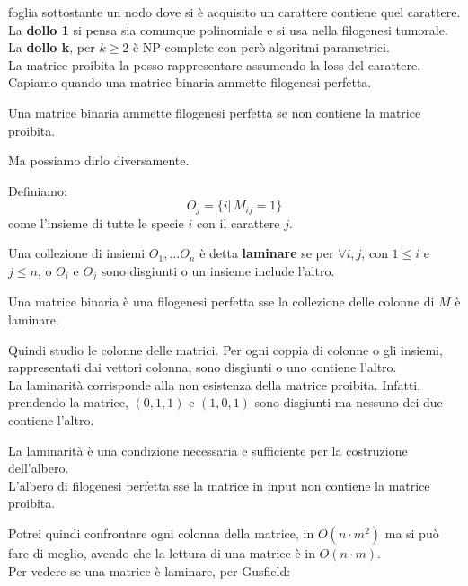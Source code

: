 \documentclass[a4paper,12pt, oneside]{book}
\begin{document}
foglia sottostante un nodo dove si è acquisito un carattere contiene quel
carattere. \\ 
La \textbf{dollo 1} si pensa sia comunque polinomiale e si usa nella filogenesi
tumorale.\\
La \textbf{dollo k}, per $k\geq 2$ è NP-complete con però algoritmi
parametrici.\\
La matrice proibita la posso rappresentare assumendo la loss del carattere.\\
Capiamo quando una matrice binaria ammette filogenesi perfetta.
\begin{teorema}
  Una matrice binaria ammette filogenesi perfetta se non contiene la matrice
  proibita.
\end{teorema}
Ma possiamo dirlo diversamente.
\begin{definizione}
  Definiamo:
  \[O_j=\{i|\,M_{ij}=1\}\]
  come l'insieme di tutte le specie $i$ con il carattere $j$.
\end{definizione}
\begin{definizione}
  Una collezione di insiemi $O_1,\ldots O_n$ è detta \textbf{laminare} se per
  $\forall i,j$, con $1\leq i$ e $j\leq n$, o $O_i$ e $O_j$ sono disgiunti o
  un insieme include l'altro.
\end{definizione}
\begin{teorema}
  Una matrice binaria è una filogenesi perfetta sse la collezione delle colonne
  di $M$ è laminare.
\end{teorema}
Quindi studio le colonne delle matrici. Per ogni coppia di colonne o gli
insiemi, rappresentati dai vettori colonna, sono disgiunti o uno contiene
l'altro. \\
La laminarità corrisponde alla non esistenza della matrice proibita. Infatti,
prendendo la matrice, $(0,1,1)$ e $(1,0,1)$ sono disgiunti ma nessuno dei due
contiene l'altro.
\begin{teorema}
  La laminarità è una condizione necessaria e sufficiente per la costruzione
  dell'albero. \\
  L'albero di filogenesi perfetta sse la matrice in input non contiene la
  matrice proibita. 
\end{teorema}
Potrei quindi confrontare ogni colonna della matrice, in $O(n\cdot m^2)$ ma si
può fare di meglio, avendo che la lettura di una matrice è in $O(n\cdot m)$.\\ 
Per vedere se una matrice è laminare, per Gusfield:
\end{document}
